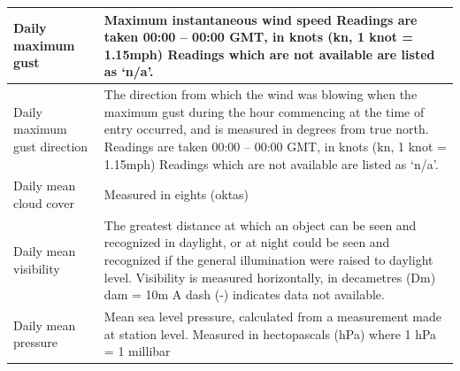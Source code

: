 \documentclass[fleqn, 11pt]{article}
\begin{document}
\begin{tabular}{|p{5.5cm}|p{11.5cm}|}
		\hline
		Daily maximum gust & Maximum instantaneous wind speed \newline Readings are taken 00:00 – 00:00 GMT, in knots (kn, 1 knot = 1.15mph) \newline
		Readings which are not available are listed as ‘n/a’.  \\
		\hline
		Daily maximum gust direction & The direction from which the wind was blowing when the maximum gust during the hour commencing at the time of entry occurred, and is measured in degrees from true north. \newline Readings are taken 00:00 – 00:00 GMT, in knots (kn, 1 knot = 1.15mph) \newline
		Readings which are not available are listed as ‘n/a’.  \\
		\hline
		Daily mean cloud cover & Measured in eights (oktas)   \\
		\hline
		Daily mean visibility & The greatest distance at which an object can be seen and recognized in daylight, or at night could be seen and recognized if the general illumination were raised to daylight level. 
		\newline Visibility is measured horizontally, in decametres (Dm) dam = 10m \newline A dash (-) indicates data not available.
		\\
		\hline
		Daily mean pressure & Mean sea level pressure, calculated from a measurement made at station level. \newline Measured in hectopascals (hPa) 	where 1 hPa = 1 millibar
		\\
		\hline
	\end{tabular}
\end{document}
